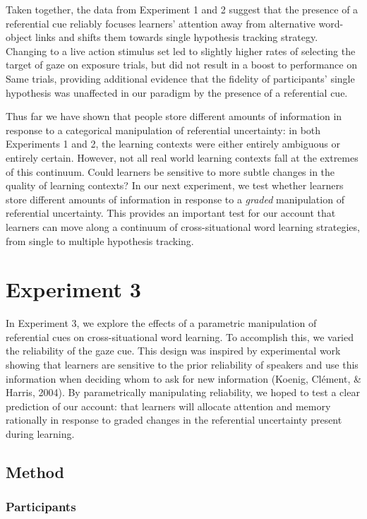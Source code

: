 \documentclass[a4paper,man,natbib]{apa6}
\begin{document}
Taken together, the data from Experiment 1 and 2 suggest that the
presence of a referential cue reliably focuses learners' attention away
from alternative word-object links and shifts them towards single
hypothesis tracking strategy. Changing to a live action stimulus set led
to slightly higher rates of selecting the target of gaze on exposure
trials, but did not result in a boost to performance on Same trials,
providing additional evidence that the fidelity of participants' single
hypothesis was unaffected in our paradigm by the presence of a
referential cue.

Thus far we have shown that people store different amounts of
information in response to a categorical manipulation of referential
uncertainty: in both Experiments 1 and 2, the learning contexts were
either entirely ambiguous or entirely certain. However, not all real
world learning contexts fall at the extremes of this continuum. Could
learners be sensitive to more subtle changes in the quality of learning
contexts? In our next experiment, we test whether learners store
different amounts of information in response to a \emph{graded}
manipulation of referential uncertainty. This provides an important test
for our account that learners can move along a continuum of
cross-situational word learning strategies, from single to multiple
hypothesis tracking.

\section{Experiment 3}\label{experiment-3}

In Experiment 3, we explore the effects of a parametric manipulation of
referential cues on cross-situational word learning. To accomplish this,
we varied the reliability of the gaze cue. This design was inspired by
experimental work showing that learners are sensitive to the prior
reliability of speakers and use this information when deciding whom to
ask for new information (Koenig, Cl{é}ment, \& Harris, 2004). By
parametrically manipulating reliability, we hoped to test a clear
prediction of our account: that learners will allocate attention and
memory rationally in response to graded changes in the referential
uncertainty present during learning.

\subsection{Method}\label{method-2}

\subsubsection{Participants}\label{participants-2}
\end{document}
